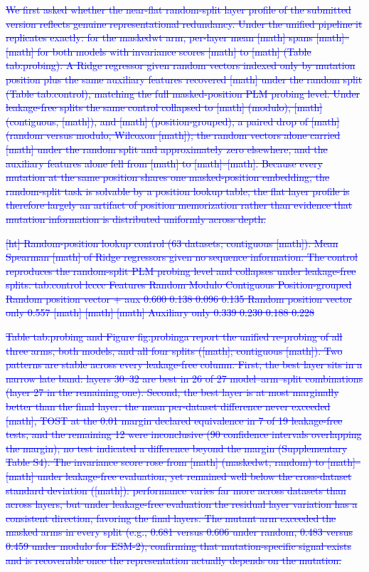 \documentclass[11pt,a4paper]{article}
\begin{document}
\textcolor{blue}{\sout{We first asked whether the near-flat random-split layer profile of the submitted
version reflects genuine representational redundancy. Under the unified pipeline it
replicates exactly: for the maskedwt arm, per-layer mean [math] spans
[math]--[math] for both models with invariance scores [math] to [math] (Table tab:probing). A Ridge regressor given
random vectors indexed only by mutation position plus the same auxiliary
features recovered [math] under the random split (Table tab:control),
matching the full masked-position PLM probing level. Under leakage-free splits the
same control collapsed to [math] (modulo), [math] (contiguous, [math]), and
[math] (position-grouped), a paired drop of [math] (random versus modulo, Wilcoxon
[math]); the random vectors alone carried [math] under the random
split and approximately zero elsewhere, and the auxiliary features alone fell from
[math] to [math]--[math]. Because every mutation at the same position shares one
masked-position embedding, the random-split task is solvable by a position lookup
table; the flat layer profile is therefore largely an artifact of position
memorization rather than evidence that mutation information is distributed uniformly
across depth.}}

\textcolor{blue}{\sout{[ht]
Random-position lookup control (63 datasets; contiguous [math]).
Mean Spearman [math] of Ridge regressors given no sequence information. The control
reproduces the random-split PLM probing level and collapses under leakage-free
splits.
tab:control
lcccc
Features Random Modulo Contiguous Position-grouped 
Random position vector + aux 0.600 0.138 0.096 0.135 
Random position vector only 0.557 [math] [math] [math] 
Auxiliary only 0.339 0.230 0.188 0.228}}

\textcolor{blue}{\sout{Table tab:probing and Figure fig:probinga report the unified
re-probing of all three arms,
both models, and all four splits ([math]; contiguous [math]). Two patterns are
stable across every leakage-free column. First, the best layer sits in a narrow late
band: layers 30--32 are best in 26 of 27 model--arm--split combinations (layer 27 in
the remaining one). Second, the best layer is at most marginally better than the
final layer: the mean per-dataset difference never exceeded [math],
TOST at the 0.01 margin declared equivalence in 7 of 19 leakage-free tests, and the
remaining 12 were inconclusive (90 confidence intervals overlapping the margin); no
test indicated a difference beyond the margin (Supplementary Table S4). The
invariance score rose from [math] (maskedwt, random) to
[math]--[math] under leakage-free evaluation, yet remained well below the
cross-dataset standard deviation ([math]): performance varies far more
across datasets than across layers, but under leakage-free evaluation
the residual layer variation has a consistent direction, favoring the final layers.
The mutant arm exceeded the masked arms in every split (e.g., 0.681 versus 0.606
under random, 0.483 versus 0.459 under modulo for ESM-2), confirming that
mutation-specific signal exists and is recoverable once the representation actually
depends on the mutation.}}
\end{document}
